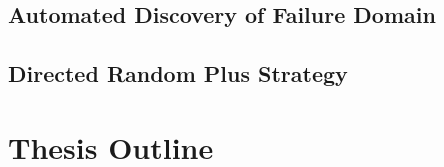 \subsection{Automated Discovery of Failure Domain}
\subsection{Directed Random Plus Strategy}

\section{Thesis Outline}











